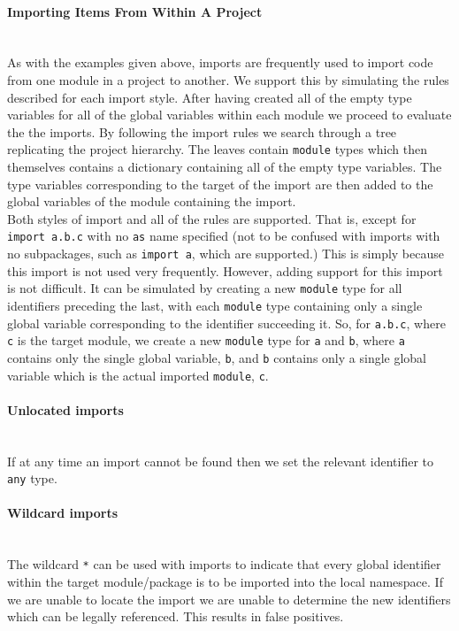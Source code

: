 \documentclass[12pt, titlepage]{article}
\begin{document}
\paragraph*{Importing Items From Within A Project}\mbox{}\\
As with the examples given above, imports are frequently used to import code from one module in a project to another. We support this by simulating the rules described for each import style. After having created all of the empty type variables for all of the global variables within each module we proceed to evaluate the the imports. By following the import rules we search through a tree replicating the project hierarchy. The leaves contain \texttt{module} types which then themselves contains a dictionary containing all of the empty type variables. The type variables corresponding to the target of the import are then added to the global variables of the module containing the import. \\
\indent Both styles of import and all of the rules are supported. That is, except for \texttt{import a.b.c} with no \texttt{as} name specified (not to be confused with imports with no subpackages, such as \texttt{import a}, which are supported.) This is simply because this import is not used very frequently. However, adding support for this import is not difficult. It can be simulated by creating a new \texttt{module} type for all identifiers preceding the last, with each \texttt{module} type containing only a single global variable corresponding to the identifier succeeding it. So, for \texttt{a.b.c}, where \texttt{c} is the target module, we create a new \texttt{module} type for \texttt{a} and \texttt{b}, where \texttt{a} contains only the single global variable, \texttt{b}, and \texttt{b} contains only a single global variable which is the actual imported \texttt{module}, \texttt{c}.


\paragraph*{Unlocated imports}\mbox{} \\
If at any time an import cannot be found then we set the relevant identifier to \texttt{any} type.

\paragraph*{Wildcard imports}\mbox{} \\
The wildcard \texttt{*} can be used with imports to indicate that every global identifier within the target module/package is to be imported into the local namespace. If we are unable to locate the import we are unable to determine the new identifiers which can be legally referenced. This results in false positives.
\end{document}
